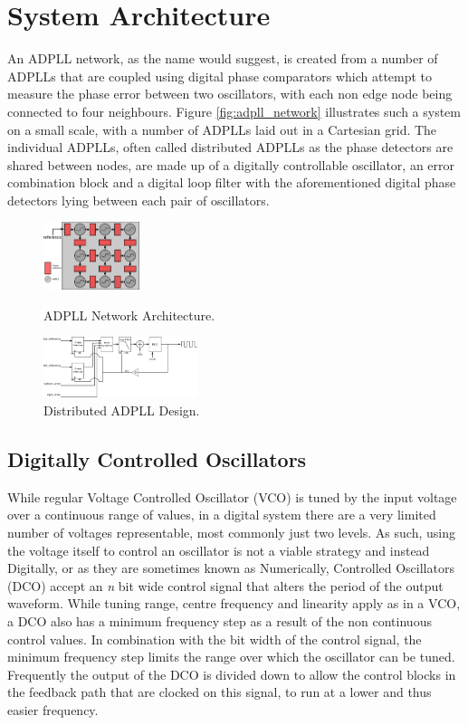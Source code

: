 \documentclass[conference]{IEEEtran}
\begin{document}
{\section{System Architecture}
An ADPLL network, as the name would suggest, is created from a number of ADPLLs that are coupled using digital phase comparators which attempt to measure the phase error between two oscillators, with each non edge node being connected to four neighbours. Figure \ref{fig:adpll_network} illustrates such a system on a small scale, with a number of ADPLLs laid out in a Cartesian grid. The individual ADPLLs, often called distributed ADPLLs as the phase detectors are shared between nodes, are made up of a digitally controllable oscillator, an error combination block and a digital loop filter with the aforementioned digital phase detectors lying between each pair of oscillators.
\begin{figure}[h]
    \centering
    \includegraphics[width=0.25\textwidth]{adpll_network}
    \caption{ADPLL Network Architecture.}
    \label{fig:adpll_network}
    \vspace{0.5cm}
    \includegraphics[width=0.4\textwidth]{dist_adpll}
    \caption{Distributed ADPLL Design.}
    \label{fig:adpll_base}
\end{figure}
\subsection{Digitally Controlled Oscillators}
While regular Voltage Controlled Oscillator (VCO) is tuned by the input voltage over a continuous range of values, in a digital system there are a very limited number of voltages representable, most commonly just two levels. As such, using the voltage itself to control an oscillator is not a viable strategy and instead Digitally, or as they are sometimes known as Numerically, Controlled Oscillators (DCO) accept an \textit{n} bit wide control signal that alters the period of the output waveform. While tuning range, centre frequency and linearity apply as in a VCO, a DCO also has a minimum frequency step as a result of the non continuous control values. %
In combination with the bit width of the control signal, the minimum frequency step limits the range over which the oscillator can be tuned. Frequently the output of the DCO is divided down to allow the control blocks in the feedback path that are clocked on this signal, to run at a lower and thus easier frequency.
}
\end{document}
